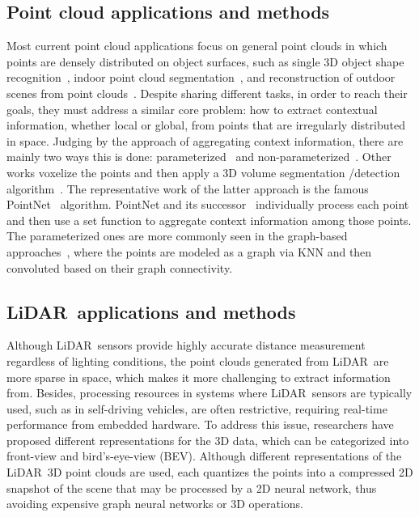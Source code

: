 \documentclass[10pt,twocolumn,letterpaper]{article}
\newcommand{\lidar}{\mbox{LiDAR }}
\begin{document}
\subsection{Point cloud applications and methods}
Most current point cloud applications focus on general point clouds in which points are densely distributed on object surfaces, such as single 3D object shape recognition~\cite{wang2019dynamic}, indoor point cloud segmentation~\cite{tchapmi2017segcloud,shi2019pointrcnn}, and reconstruction of outdoor scenes from point clouds~\cite{Tatarchenko_2018_CVPR}.
Despite sharing different tasks, in order to reach their goals, they must address a similar core problem: how to extract contextual information, whether local or global, from points that are irregularly distributed in space. Judging by the approach of aggregating context information, there are mainly two ways this is done: parameterized~\cite{wang2019dynamic,velickovic2018graph,landrieu2018large,huang2018recurrent} and non-parameterized~\cite{qi2017pointnet,qi2017pointnet++,shi2019pointrcnn}. Other works voxelize the points and then apply a 3D volume segmentation /detection algorithm~\cite{tchapmi2017segcloud}.
The representative work of the latter approach is the famous PointNet~\cite{qi2017pointnet} algorithm. PointNet and its successor~\cite{qi2017pointnet++} individually process each point and then use a set function to aggregate context information among those points. The parameterized ones are more commonly seen in the graph-based approaches~\cite{wang2019dynamic,velickovic2018graph,landrieu2018large}, where the points are modeled as a graph via KNN and then convoluted based on their graph connectivity.

\subsection{\lidar applications and methods}

Although \lidar sensors provide highly accurate distance measurement regardless of lighting conditions, the point clouds generated from \lidar are more sparse in space, which makes it more challenging to extract information from. Besides, processing resources in systems where \lidar sensors are typically used, such as in self-driving vehicles, are often restrictive, requiring real-time performance from embedded hardware. To address this issue, researchers have proposed different representations for the 3D data, which can be categorized into front-view and bird's-eye-view (BEV). Although different representations of the \lidar 3D point clouds are used, each quantizes the points into a compressed 2D snapshot of the scene that may be processed by a 2D neural network, thus avoiding expensive graph neural networks or 3D operations. 
\end{document}
